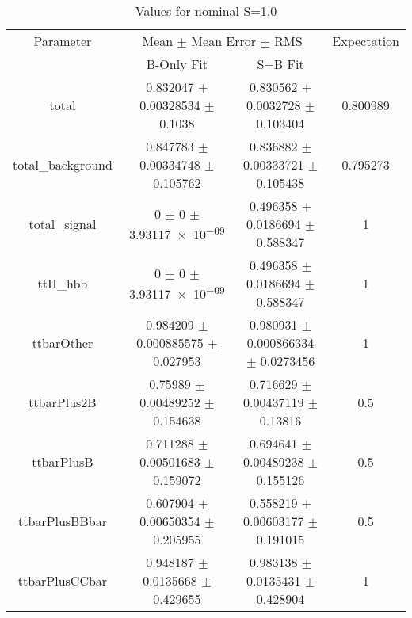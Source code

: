 \begin{table}
\centering
\caption{Values for nominal S=1.0}
\begin{tabular}{cccc}
\toprule
Parameter & \multicolumn{2}{c}{Mean $\pm$ Mean Error $\pm$ RMS} & Expectation\\
 & B-Only Fit & S+B Fit & \\
\midrule
total & \num{0.832047} $\pm$ \num{0.00328534} $\pm$ \num{0.1038} & \num{0.830562} $\pm$ \num{0.0032728} $\pm$ \num{0.103404} & \num{0.800989}\\
total\_background & \num{0.847783} $\pm$ \num{0.00334748} $\pm$ \num{0.105762} & \num{0.836882} $\pm$ \num{0.00333721} $\pm$ \num{0.105438} & \num{0.795273}\\
total\_signal & \num{0} $\pm$ \num{0} $\pm$ \num{3.93117e-09} & \num{0.496358} $\pm$ \num{0.0186694} $\pm$ \num{0.588347} & \num{1}\\
ttH\_hbb & \num{0} $\pm$ \num{0} $\pm$ \num{3.93117e-09} & \num{0.496358} $\pm$ \num{0.0186694} $\pm$ \num{0.588347} & \num{1}\\
ttbarOther & \num{0.984209} $\pm$ \num{0.000885575} $\pm$ \num{0.027953} & \num{0.980931} $\pm$ \num{0.000866334} $\pm$ \num{0.0273456} & \num{1}\\
ttbarPlus2B & \num{0.75989} $\pm$ \num{0.00489252} $\pm$ \num{0.154638} & \num{0.716629} $\pm$ \num{0.00437119} $\pm$ \num{0.13816} & \num{0.5}\\
ttbarPlusB & \num{0.711288} $\pm$ \num{0.00501683} $\pm$ \num{0.159072} & \num{0.694641} $\pm$ \num{0.00489238} $\pm$ \num{0.155126} & \num{0.5}\\
ttbarPlusBBbar & \num{0.607904} $\pm$ \num{0.00650354} $\pm$ \num{0.205955} & \num{0.558219} $\pm$ \num{0.00603177} $\pm$ \num{0.191015} & \num{0.5}\\
ttbarPlusCCbar & \num{0.948187} $\pm$ \num{0.0135668} $\pm$ \num{0.429655} & \num{0.983138} $\pm$ \num{0.0135431} $\pm$ \num{0.428904} & \num{1}\\
\bottomrule
\end{tabular}
\end{table}